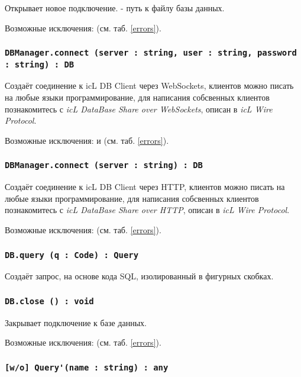 Открывает новое подключение.  - путь к файлу базы данных.

Возможные исключения:  (см. таб. \ref{errors}).

\subsubsection{\lstinline|DBManager.connect (server : string, user : string, password : string) : DB|}

Создаёт соединение к icL DB Client через WebSockets, клиентов можно писать на любые языки программирование, для написания собсвенных клиентов познакомитесь с \textit{icL DataBase Share over WebSockets}, описан в \textit{icL Wire Protocol}.

Возможные исключения:  и  (см. таб. \ref{errors}).

\subsubsection{\lstinline|DBManager.connect (server : string) : DB|}

Создаёт соединение к icL DB Client через HTTP, клиентов можно писать на любые языки программирование, для написания собсвенных клиентов познакомитесь с \textit{icL DataBase Share over HTTP}, описан в \textit{icL Wire Protocol}.

Возможные исключения:  (см. таб. \ref{errors}).

\subsubsection{\lstinline|DB.query (q : Code) : Query|}

Создаёт запрос, на основе кода SQL, изолированный в фигурных скобках.

\subsubsection{\lstinline|DB.close () : void|}

Закрывает подключение к базе данных.

Возможные исключения:  (см. таб. \ref{errors}).

\subsubsection{\lstinline|[w/o] Query'(name : string) : any|}

